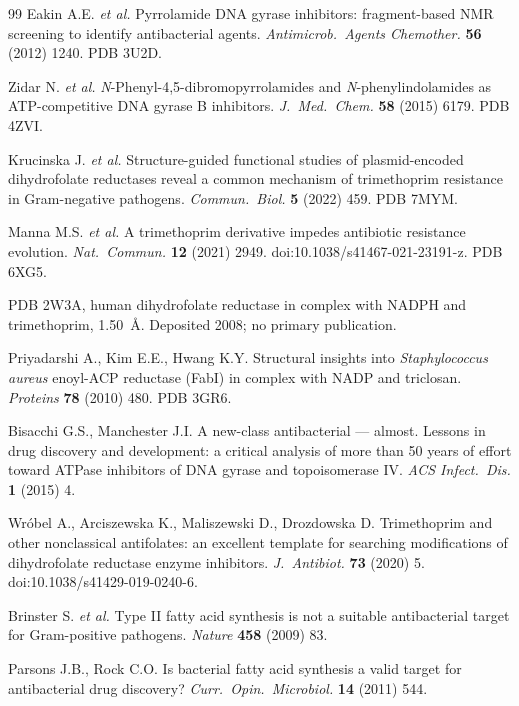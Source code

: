 \documentclass[11pt,a4paper]{article}
\begin{document}
\begin{thebibliography}{99}
\small
{} Eakin A.E. \textit{et al.} Pyrrolamide DNA gyrase
inhibitors: fragment-based NMR screening to identify antibacterial agents.
\textit{Antimicrob.\ Agents Chemother.} \textbf{56} (2012) 1240. PDB 3U2D.

 Zidar N. \textit{et al.}
\textit{N}-Phenyl-4,5-dibromopyrrolamides and \textit{N}-phenylindolamides as
ATP-competitive DNA gyrase B inhibitors. \textit{J.\ Med.\ Chem.}
\textbf{58} (2015) 6179. PDB 4ZVI.

 Krucinska J. \textit{et al.} Structure-guided
functional studies of plasmid-encoded dihydrofolate reductases reveal a common
mechanism of trimethoprim resistance in Gram-negative pathogens.
\textit{Commun.\ Biol.} \textbf{5} (2022) 459. PDB 7MYM.

 Manna M.S. \textit{et al.} A trimethoprim derivative
impedes antibiotic resistance evolution. \textit{Nat.\ Commun.} \textbf{12}
(2021) 2949. doi:10.1038/s41467-021-23191-z. PDB 6XG5.

 PDB 2W3A, human dihydrofolate reductase in complex with
NADPH and trimethoprim, 1.50~\AA. Deposited 2008; no primary publication.

 Priyadarshi A., Kim E.E., Hwang K.Y. Structural
insights into \textit{Staphylococcus aureus} enoyl-ACP reductase (FabI) in
complex with NADP and triclosan. \textit{Proteins} \textbf{78} (2010) 480.
PDB 3GR6.

 Bisacchi G.S., Manchester J.I. A new-class
antibacterial --- almost. Lessons in drug discovery and development: a
critical analysis of more than 50 years of effort toward ATPase inhibitors of
DNA gyrase and topoisomerase IV. \textit{ACS Infect.\ Dis.} \textbf{1} (2015)
4.

 Wróbel A., Arciszewska K., Maliszewski D., Drozdowska D.
Trimethoprim and other nonclassical antifolates: an excellent template for
searching modifications of dihydrofolate reductase enzyme inhibitors.
\textit{J.\ Antibiot.} \textbf{73} (2020) 5. doi:10.1038/s41429-019-0240-6.

 Brinster S. \textit{et al.} Type II fatty acid
synthesis is not a suitable antibacterial target for Gram-positive pathogens.
\textit{Nature} \textbf{458} (2009) 83.

 Parsons J.B., Rock C.O. Is bacterial fatty acid
synthesis a valid target for antibacterial drug discovery?
\textit{Curr.\ Opin.\ Microbiol.} \textbf{14} (2011) 544.


\end{thebibliography}
\end{document}
